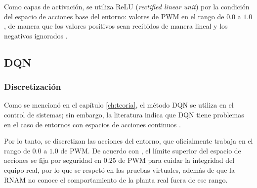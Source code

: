 Como capas de activación, se utiliza ReLU (\textit{rectified linear unit}) por la condición del espacio de acciones base del entorno: valores de PWM en el rango de $0.0$ a $1.0$, de manera que los valores positivos sean recibidos de manera lineal y los negativos ignorados \cite{DataScience}.
 
 
\subsection{DQN}

\subsubsection{Discretización}

Como se mencionó en el capítulo \ref{ch:teoria}, el método DQN se utiliza en el control de sistemas; sin embargo, la literatura indica que DQN tiene problemas en el caso de entornos con espacios de acciones continuos \cite{ForoDQN}.

Por lo tanto, se discretizan las acciones del entorno, que oficialmente trabaja en el rango de $0.0$ a $1.0$ de PWM. De acuerdo con \cite{JorgeBrenes}, el límite superior del espacio de acciones se fija por seguridad en $0.25$ de PWM para cuidar la integridad del equipo real, por lo que se respetó en las pruebas virtuales, además de que la RNAM no conoce el comportamiento de la planta real fuera de ese rango.

